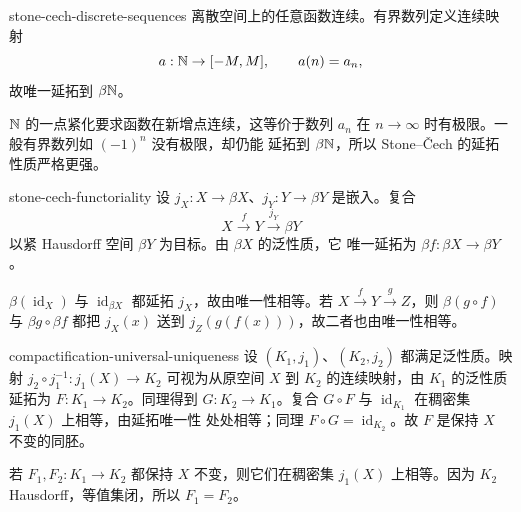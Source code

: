 \begin{solution}{stone-cech-discrete-sequences}
离散空间上的任意函数连续。有界数列定义连续映射
\[
 a:\mathbb{N}\to[-M,M],\qquad a(n)=a_n,
\]
故唯一延拓到 \(\beta\mathbb{N}\)。

\(\mathbb{N}\) 的一点紧化要求函数在新增点连续，这等价于数列 \(a_n\) 在
\(n\to\infty\) 时有极限。一般有界数列如 \((-1)^n\) 没有极限，却仍能
延拓到 \(\beta\mathbb{N}\)，所以 Stone--Čech 的延拓性质严格更强。
\end{solution}

\begin{solution}{stone-cech-functoriality}
设 \(j_X:X\to\beta X\)、\(j_Y:Y\to\beta Y\) 是嵌入。复合
\[
 X\xrightarrow{f}Y\xrightarrow{j_Y}\beta Y
\]
以紧 Hausdorff 空间 \(\beta Y\) 为目标。由 \(\beta X\) 的泛性质，它
唯一延拓为 \(\beta f:\beta X\to\beta Y\)。

\(\beta(\operatorname{id}_X)\) 与 \(\operatorname{id}_{\beta X}\) 都延拓
\(j_X\)，故由唯一性相等。若 \(X\xrightarrow fY\xrightarrow gZ\)，则
\(\beta(g\circ f)\) 与 \(\beta g\circ\beta f\) 都把
\(j_X(x)\) 送到 \(j_Z(g(f(x)))\)，故二者也由唯一性相等。
\end{solution}

\begin{solution}{compactification-universal-uniqueness}
设 \((K_1,j_1)\)、\((K_2,j_2)\) 都满足泛性质。映射
\(j_2\circ j_1^{-1}:j_1(X)\to K_2\) 可视为从原空间 \(X\) 到 \(K_2\)
的连续映射，由 \(K_1\) 的泛性质延拓为 \(F:K_1\to K_2\)。同理得到
\(G:K_2\to K_1\)。复合 \(G\circ F\) 与
\(\operatorname{id}_{K_1}\) 在稠密集 \(j_1(X)\) 上相等，由延拓唯一性
处处相等；同理 \(F\circ G=\operatorname{id}_{K_2}\)。故 \(F\) 是保持
\(X\) 不变的同胚。

若 \(F_1,F_2:K_1\to K_2\) 都保持 \(X\) 不变，则它们在稠密集
\(j_1(X)\) 上相等。因为 \(K_2\) Hausdorff，等值集闭，所以
\(F_1=F_2\)。
\end{solution}
